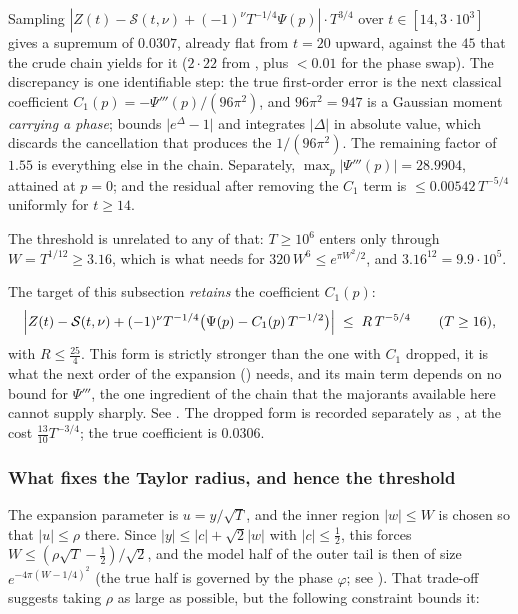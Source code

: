 \begin{remark}
\label{rem:rsf_measured}
Sampling $|Z(t)-\mathcal S(t,\nu)+(-1)^{\nu}T^{-1/4}\Psi(p)|\cdot T^{3/4}$ over
$t\in[14,3\cdot10^{3}]$ gives a supremum of $0.0307$, already flat from $t=20$ upward, against
the $45$ that the crude chain yields for it ($2\cdot22$ from , plus
$<0.01$ for the phase swap).  The discrepancy is one identifiable step: the true
first-order error is the next classical coefficient
$C_{1}(p)=-\Psi'''(p)/(96\pi^{2})$, and $96\pi^{2}=947$ is a Gaussian moment \emph{carrying a
phase};  bounds $\lvert e^{\Delta}-1\rvert$ and integrates
$\lvert\Delta\rvert$ in absolute value, which discards the cancellation that produces the
$1/(96\pi^{2})$.  The remaining factor of $1.55$ is everything else in the chain.  Separately,
$\max_{p}\lvert\Psi'''(p)\rvert=28.9904$, attained at $p=0$; and the residual after removing the
$C_{1}$ term is $\le0.00542\,T^{-5/4}$ uniformly for $t\ge14$.

The threshold is unrelated to any of that: $T\ge10^{6}$ enters only through
$W=T^{1/12}\ge3.16$, which is what  needs for
$320\,W^{6}\le e^{\pi W^{2}/2}$, and $3.16^{12}=9.9\cdot10^{5}$.
\end{remark}

The target of this subsection \emph{retains} the coefficient $C_{1}(p)$:
\begin{equation}
  \Bigl\lvert Z(t)-\mathcal S(t,\nu)
     +(-1)^{\nu}T^{-1/4}\bigl(\Psi(p)-C_{1}(p)\,T^{-1/2}\bigr)\Bigr\rvert
   \;\le\;R\,T^{-5/4}
   \qquad(T\ge16),
  \label{eq:rsf_sharp_target}
\end{equation}
with $R\le\tfrac{25}4$.  This form is strictly stronger than the one with $C_{1}$ dropped, it
is what the next order of the expansion () needs, and its main term
depends on no bound for $\Psi'''$, the one ingredient of the chain that the majorants available
here cannot supply sharply.  See .  The dropped form is recorded
separately as , at the cost $\tfrac{13}{10}T^{-3/4}$; the true
coefficient is $0.0306$.

\subsubsection*{What fixes the Taylor radius, and hence the threshold}

The expansion parameter is $u=y/\sqrt T$, and the inner region $\lvert w\rvert\le W$ is chosen
so that $\lvert u\rvert\le\rho$ there.  Since $\lvert y\rvert\le\lvert c\rvert+\sqrt2\lvert
w\rvert$ with $\lvert c\rvert\le\tfrac12$, this forces $W\le(\rho\sqrt T-\tfrac12)/\sqrt2$, and
the model half of the outer tail is then of size $e^{-4\pi(W-1/4)^{2}}$ (the true half is
governed by the phase $\varphi$; see ).  That trade-off
suggests taking $\rho$ as large as possible, but the following constraint bounds it:

